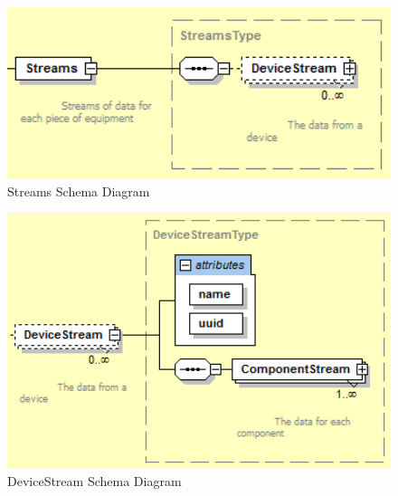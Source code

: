 \begin{figure}[ht]
  \centering
    \includegraphics[width=1.0\textwidth]{figures/Streams Schema.png}
  \caption{Streams Schema Diagram}
  \label{fig:Streams Schema Diagram}
\end{figure}

\FloatBarrier


\begin{figure}[ht]
  \centering
    \includegraphics[width=1.0\textwidth]{figures/DeviceStream Schema.png}
  \caption{DeviceStream Schema Diagram}
  \label{fig:DeviceStream Schema Diagram}
\end{figure}

\FloatBarrier



